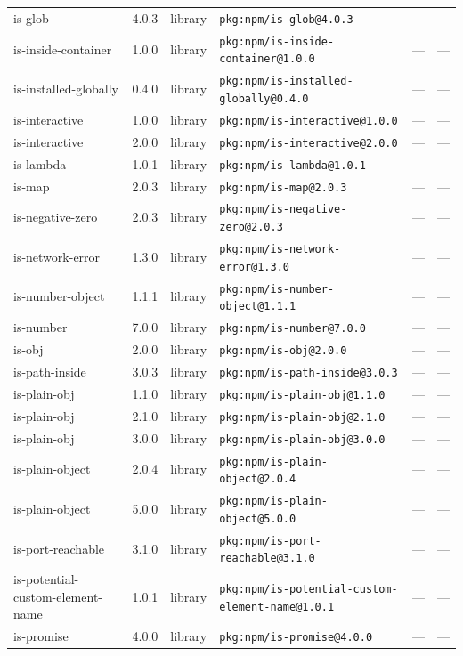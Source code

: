 \documentclass[11pt]{article}
\begin{document}
\begin{longtable}{|l|l|l|p{2.2cm}|l|p{4cm}|}
is-glob & 4.0.3 & library & \texttt{pkg:npm/is-glob@4.0.3} & — & — \\
is-inside-container & 1.0.0 & library & \texttt{pkg:npm/is-inside-container@1.0.0} & — & — \\
is-installed-globally & 0.4.0 & library & \texttt{pkg:npm/is-installed-globally@0.4.0} & — & — \\
is-interactive & 1.0.0 & library & \texttt{pkg:npm/is-interactive@1.0.0} & — & — \\
is-interactive & 2.0.0 & library & \texttt{pkg:npm/is-interactive@2.0.0} & — & — \\
is-lambda & 1.0.1 & library & \texttt{pkg:npm/is-lambda@1.0.1} & — & — \\
is-map & 2.0.3 & library & \texttt{pkg:npm/is-map@2.0.3} & — & — \\
is-negative-zero & 2.0.3 & library & \texttt{pkg:npm/is-negative-zero@2.0.3} & — & — \\
is-network-error & 1.3.0 & library & \texttt{pkg:npm/is-network-error@1.3.0} & — & — \\
is-number-object & 1.1.1 & library & \texttt{pkg:npm/is-number-object@1.1.1} & — & — \\
is-number & 7.0.0 & library & \texttt{pkg:npm/is-number@7.0.0} & — & — \\
is-obj & 2.0.0 & library & \texttt{pkg:npm/is-obj@2.0.0} & — & — \\
is-path-inside & 3.0.3 & library & \texttt{pkg:npm/is-path-inside@3.0.3} & — & — \\
is-plain-obj & 1.1.0 & library & \texttt{pkg:npm/is-plain-obj@1.1.0} & — & — \\
is-plain-obj & 2.1.0 & library & \texttt{pkg:npm/is-plain-obj@2.1.0} & — & — \\
is-plain-obj & 3.0.0 & library & \texttt{pkg:npm/is-plain-obj@3.0.0} & — & — \\
is-plain-object & 2.0.4 & library & \texttt{pkg:npm/is-plain-object@2.0.4} & — & — \\
is-plain-object & 5.0.0 & library & \texttt{pkg:npm/is-plain-object@5.0.0} & — & — \\
is-port-reachable & 3.1.0 & library & \texttt{pkg:npm/is-port-reachable@3.1.0} & — & — \\
is-potential-custom-element-name & 1.0.1 & library & \texttt{pkg:npm/is-potential-custom-element-name@1.0.1} & — & — \\
is-promise & 4.0.0 & library & \texttt{pkg:npm/is-promise@4.0.0} & — & — \\

\end{longtable}
\end{document}
